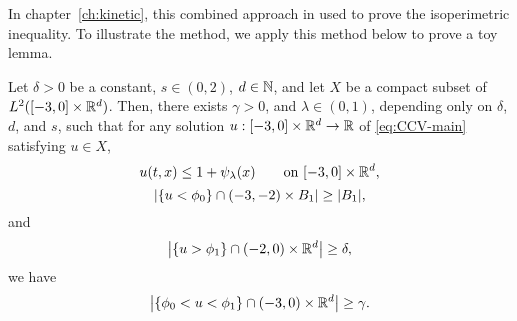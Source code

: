 In chapter~\ref{ch:kinetic}, this combined approach in used to prove the isoperimetric inequality.  To illustrate the method, we apply this method below to prove a toy lemma.  


\begin{lemma}
Let $\delta>0$ be a constant, $s \in (0,2)$, $d \in \mathbb{N}$, and let $X$ be a compact subset of $L^2([-3,0]\times\mathbb{R}^d)$.  Then, there exists $\gamma > 0$, and $\lambda \in (0,1)$, depending only on $\delta$, $d$, and $s$, such that for any solution $u:[-3,0] \times \mathbb{R}^d \to \mathbb{R}$ of \eqref{eq:CCV-main} satisfying $u \in X$, 
\[ u(t,x) \leq 1 + \psi_\lambda(x) \qquad \textrm{on } [-3,0]\times\mathbb{R}^d, \]
\[ \left\lvert \{u < \phi_0\} \cap (-3,-2)\times B_1 \right\rvert \geq |B_1|, \]
and
\[ \left\lvert \{u > \phi_1\} \cap (-2,0)\times \mathbb{R}^d \right\rvert \geq \delta, \]
we have
\[ \left\lvert \{\phi_0 < u < \phi_1\} \cap (-3,0)\times \mathbb{R}^d \right\rvert \geq \gamma. \]
\end{lemma}

